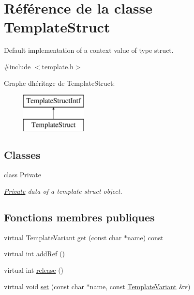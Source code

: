 \hypertarget{class_template_struct}{}\section{Référence de la classe Template\+Struct}
\label{class_template_struct}


Default implementation of a context value of type struct.  




{\ttfamily \#include $<$template.\+h$>$}

Graphe d\textquotesingle{}héritage de Template\+Struct\+:\begin{figure}[H]
\begin{center}
\leavevmode
\includegraphics[height=2.000000cm]{class_template_struct}
\end{center}
\end{figure}
\subsection*{Classes}
\begin{DoxyCompactItemize}
\item 
class \hyperlink{class_template_struct_1_1_private}{Private}
\begin{DoxyCompactList}\small\item\em \hyperlink{class_template_struct_1_1_private}{Private} data of a template struct object. \end{DoxyCompactList}\end{DoxyCompactItemize}
\subsection*{Fonctions membres publiques}
\begin{DoxyCompactItemize}
\item 
virtual \hyperlink{class_template_variant}{Template\+Variant} \hyperlink{class_template_struct_ac5e76ae7bac0bd13ec07153d4a9d0da7}{get} (const char $\ast$name) const 
\item 
virtual int \hyperlink{class_template_struct_a3fc49f671cd0c2d963f50977f3842541}{add\+Ref} ()
\item 
virtual int \hyperlink{class_template_struct_a4ef2dfe170fe108e52949b9e9c69d41d}{release} ()
\item 
virtual void \hyperlink{class_template_struct_a657ed741aec6c31883d86b211ec27e5c}{set} (const char $\ast$name, const \hyperlink{class_template_variant}{Template\+Variant} \&v)
\end{DoxyCompactItemize}
